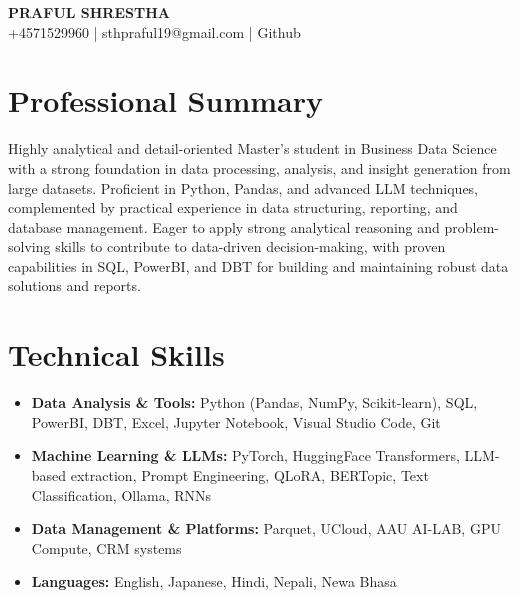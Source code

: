 \documentclass[10pt, letterpaper]{article}
\begin{document}
\begin{center}
    {\Huge \textbf{PRAFUL SHRESTHA}} \\ \vspace{4pt}
    +4571529960 | sthpraful19@gmail.com | Github
\end{center}

\section{Professional Summary}
Highly analytical and detail-oriented Master's student in Business Data Science with a strong foundation in data processing, analysis, and insight generation from large datasets. Proficient in Python, Pandas, and advanced LLM techniques, complemented by practical experience in data structuring, reporting, and database management. Eager to apply strong analytical reasoning and problem-solving skills to contribute to data-driven decision-making, with proven capabilities in SQL, PowerBI, and DBT for building and maintaining robust data solutions and reports.

\section{Technical Skills}
\begin{itemize}[leftmargin=0.15in, label={}, itemsep=-2pt]
    \item \textbf{Data Analysis \& Tools:} Python (Pandas, NumPy, Scikit-learn), SQL, PowerBI, DBT, Excel, Jupyter Notebook, Visual Studio Code, Git
    \item \textbf{Machine Learning \& LLMs:} PyTorch, HuggingFace Transformers, LLM-based extraction, Prompt Engineering, QLoRA, BERTopic, Text Classification, Ollama, RNNs
    \item \textbf{Data Management \& Platforms:} Parquet, UCloud, AAU AI-LAB, GPU Compute, CRM systems
    \item \textbf{Languages:} English, Japanese, Hindi, Nepali, Newa Bhasa

\end{itemize}

\end{document}
